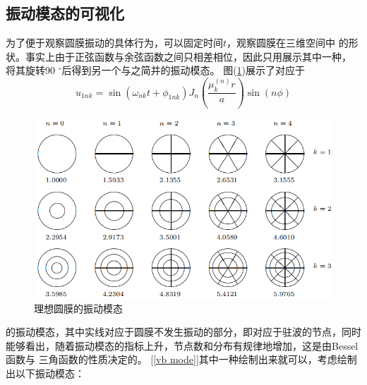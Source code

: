 \documentclass[a4paper]{ctexart}
\def\degree{$^{\circ}$}
\begin{document}
	\subsection{振动模态的可视化} 
	\par 
	为了便于观察圆膜振动的具体行为，可以固定时间$t$，观察圆膜在三维空间中
	的形状。事实上由于正弦函数与余弦函数之间只相差相位，因此只用展示其中一种，
	将其旋转90 \degree 后得到另一个与之简并的振动模态。
	图(\ref{vib img})\cite{mmtoffering}展示了对应于
	\begin{equation}
		u_{1nk} = \sin(\omega_{nk}t + \phi_{1nk}) 
				J_n\left(\frac{\mu_{k}^{(n)}r}{a}\right)\sin(n\phi)
	\end{equation}
	\begin{figure}[htbp]
		\includegraphics[scale=1]{vibration_mode_ideal.png}
		\centering
		\caption{理想圆膜的振动模态}
		\label{vib img}		
	\end{figure}
	的振动模态，其中实线对应于圆膜不发生振动的部分，即对应于驻波的节点，同时
	能够看出，随着振动模态的指标上升，节点数和分布有规律地增加，这是由Bessel函数与
	三角函数的性质决定的。
	[\ref{vb mode}]其中一种绘制出来就可以，考虑绘制出以下振动模态：
\end{document}
